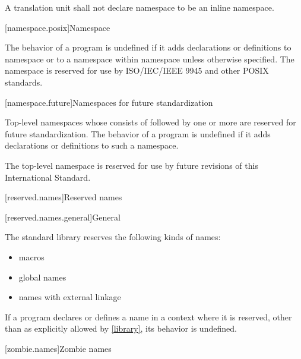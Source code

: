 \pnum
A translation unit shall not declare namespace  to be an inline namespace.

[namespace.posix]{Namespace }

\pnum
The behavior of a \Cpp{} program is undefined if it adds declarations or definitions to namespace
or to a namespace within namespace
unless otherwise specified. The namespace  is reserved for use by
ISO/IEC/IEEE 9945 and other POSIX standards.

[namespace.future]{Namespaces for future standardization}

\pnum
Top-level namespaces whose  consists of 
followed by one or more 
are reserved for future standardization.
The behavior of a \Cpp{} program is undefined if
it adds declarations or definitions to such a namespace.
\begin{example}
The top-level namespace  is reserved
for use by future revisions of this International Standard.
\end{example}

[reserved.names]{Reserved names}%

[reserved.names.general]{General}%

\pnum
The \Cpp{} standard library reserves the following kinds of names:
\begin{itemize}
\item macros
\item global names
\item names with external linkage
\end{itemize}

\pnum
If a program declares or defines a name in a context where it is
reserved, other than as explicitly allowed by \ref{library}, its behavior is
undefined.%

[zombie.names]{Zombie names}%
%
%
%

